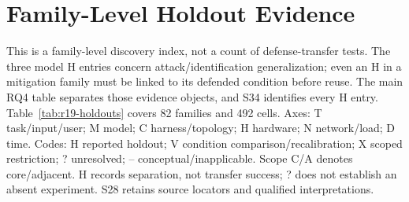 \section{Family-Level Holdout Evidence}\label{app:holdouts}
This is a family-level discovery index, not a count of defense-transfer tests. The three model H entries concern attack/identification generalization; even an H in a mitigation family must be linked to its defended condition before reuse. The main RQ4 table separates those evidence objects, and S34 identifies every H entry.
Table~\ref{tab:r19-holdouts} covers 82 families and 492 cells. Axes: T task/input/user; M model; C harness/topology; H hardware; N network/load; D time. Codes: H reported holdout; V condition comparison/recalibration; X scoped restriction; ? unresolved; -- conceptual/inapplicable. Scope C/A denotes core/adjacent. H records separation, not transfer success; ? does not establish an absent experiment. S28 retains source locators and qualified interpretations.
